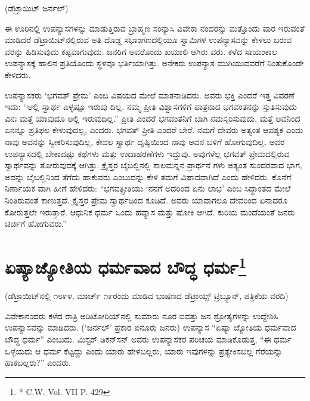 \delimiter

\begin{center}
(ಡೆಟ್ರಾಯಿಟ್​ ಜರ್ನಲ್​)
\end{center}

ಈ ಊರಿನಲ್ಲಿ ಉಪನ್ಯಾಸಗಳನ್ನು ಮಾಡುತ್ತಿರುವ ಬ್ರಾಹ್ಮಣ ಸಂನ್ಯಾಸಿ ವಿವೇಕಾ ನಂದರನ್ನು ಮತ್ತೊಂದು ವಾರ ಇರುವಂತೆ ಮಾಡಿದರೆ ಡೆಟ್ರಾಯಿಟ್​ನಲ್ಲಿರುವ ಅತಿ ದೊಡ್ಡ ಸಭಾಂಗಣದಲ್ಲಿಯೂ ಸ್ವಾಮಿಗಳ ಉಪನ್ಯಾಸವನ್ನು ಕೇಳಲು ಬರುವ ವರನ್ನು ಹಿಡಿಸುವುದು ಕಷ್ಟವಾಗುವುದು. ಜನರಿಗೆ ಅವರೊಂದು ಖಯಾಲಿ ಆಗಿರು ವರು. ಕಳೆದ ಸಾಯಂಕಾಲ ಉಪನ್ಯಾಸಕ್ಕೆ ಹಾಲಿನ ಪ್ರತಿಯೊಂದು ಸ್ಥಳವೂ ಭರ್ತಿಯಾಗಿತ್ತು. ಅನೇಕರು ಉಪನ್ಯಾಸ ಮುಗಿಯುವವರೆಗೆ ನಿಂತುಕೊಂಡೇ ಕೇಳಿದರು.

ಉಪನ್ಯಾಸಕರು ‘ಭಗವತ್​ ಪ್ರೇಮ’ ಎಂಬ ವಿಷಯದ ಮೇಲೆ ಮಾತನಾಡಿದರು. ಅವರು ಭಕ್ತಿ ಎಂದರೆ ಇತ್ತ ವಿವರಣೆ ಇದು: “ಅಲ್ಲಿ ಸ್ವಾರ್ಥ ಎಳ್ಳಷ್ಟೂ ಇರುವು ದಿಲ್ಲ. ನಮ್ಮ ಪ್ರೀತಿ ವಿಶ್ವಾಸಗಳಿಗೆ ಪಾತ್ರನಾದ ಭಗವಂತನನ್ನು ಸ್ತುತಿಸುವುದು ವಿನಃ ಮತ್ತೆ ಯಾವುದೂ ಅಲ್ಲಿ ಇರುವುದಿಲ್ಲ.” ಪ್ರೀತಿ ಎಂದರೆ ಭಗವಂತನಿಗೆ ಬಾಗಿ ನಮಸ್ಕರಿಸುವುದು, ಮತ್ತೆ ಅವನಿಂದ ಏನನ್ನೂ ಪ್ರತಿಫಲ ಕೇಳುವುದಲ್ಲ, ಎಂದರು. ಭಗವತ್​ ಪ್ರೀತಿ ಎಂದರೆ ಬೇರೆ. ನಮಗೆ ದೇವರು ಅತ್ಯಂತ ಆವಶ್ಯಕ ಎಂದು ನಾವು ಅವನನ್ನು ಸ್ವೀಕರಿಸುವುದಿಲ್ಲ, ಕೇವಲ ಸ್ವಾರ್ಥ ದೃಷ್ಟಿಯಿಂದ ನಾವು ಅವನ ಬಳಿಗೆ ಹೋಗುವುದಿಲ್ಲ. ಅವರ ಉಪನ್ಯಾಸದಲ್ಲಿ ಬೇಕಾದಷ್ಟು ಕಥೆಗಳು ಮತ್ತು ಉದಾಹರಣೆಗಳು ಇದ್ದುವು. ಅವುಗಳೆಲ್ಲ ಭಗವತ್​ ಪ್ರೇಮದಲ್ಲಿರುವ ಸ್ವಾರ್ಥವನ್ನು ತೋರುವುದಕ್ಕೆ ಆಗಿತ್ತು. ಕ್ರೈಸ್ತರ ಬೈಬಲ್ಲಿನಲ್ಲಿ ಸಾಲಮನ್ನನ ಪ್ರಾರ್ಥನೆ ಗಳು ಅತ್ಯಂತ ಸುಂದರವಾದ ಭಾಗ, ಅದನ್ನು ಬೈಬಲ್ಲಿನಿಂದ ತೆಗೆದು ಹಾಕುವರು ಎಂಬುದನ್ನು ಕೇಳಿ ತಮಗೆ ವಿಷಾದವಾಗಿದೆ ಎಂದು ಹೇಳಿದರು. ಕೊನೆಗೆ ನಿರ್ಣಾಯಕ ವಾಗಿ ಹೀಗೆ ಹೇಳಿದರು: “ಭಗವತ್ಪ್ರೀತಿಯು ‘ನನಗೆ ಅದರಿಂದ ಏನು ಲಾಭ’ ಎಂಬ ಸಿದ್ಧಾಂತದ ಮೇಲೆ ನಿಂತಿರುವಂತೆ ಕಾಣುತ್ತದೆ. ಕ್ರೈಸ್ತರ ಪ್ರೇಮ ಸ್ವಾರ್ಥದಿಂದ ಕೂಡಿದೆ. ಅವರು ಯಾವಾಗಲೂ ದೇವರಿಂದ ಏನಾದರೂ ಕೋರುತ್ತಲೇ ಇರುತ್ತಾರೆ. ಆಧುನಿಕ ಧರ್ಮ ಒಂದು ಹವ್ಯಾಸ ಮತ್ತು ಷೋಕಿ ಆಗಿದೆ. ಕುರಿಯ ಮಂದೆಯಂತೆ ಜನರು ಚರ್ಚಿಗೆ ಹೋಗುವರು.”


\section[ಏಷ್ಯಾಜ್ಯೋತಿಯ ಧರ್ಮವಾದ ಬೌದ್ಧ ಧರ್ಮ]{ಏಷ್ಯಾಜ್ಯೋತಿಯ ಧರ್ಮವಾದ ಬೌದ್ಧ ಧರ್ಮ\protect\footnote{* C.W. Vol. VII P. 429}}

\begin{center}
(ಡೆಟ್ರಾಯಿಟ್​ನಲ್ಲಿ ೧೮೯೪, ಮಾರ್ಚ್​ ೧೯ರಂದು ಮಾಡಿದ ಭಾಷಣದ ಡೆಟ್ರಾಯ್ಟ್​ ಟ್ರಿಬ್ಯೂನ್​, ಪತ್ರಿಕೆಯ ವರದಿ)
\end{center}

ವಿವೇಕಾನಂದರು ಕಳೆದ ರಾತ್ರಿ ಅಡಿಟೋರಿಯ್​ನಲ್ಲಿ ಸುಮಾರು ನೂರ ಐವತ್ತು ಜನ ಶ್ರೋತೃಗಳನ್ನು ಉದ್ದೇಶಿಸಿ ಉಪನ್ಯಾಸವನ್ನು ಮಾಡಿದರು. (‘ಜರ್ನಲ್​’ ಪ್ರಕಾರ ಐನೂರು ಜನರು) ಉಪನ್ಯಾಸ “ಏಷ್ಯಾ ಜ್ಯೋತಿಯ ಧರ್ಮವಾದ ಬೌದ್ಧ ಧರ್ಮ” ಎಂಬುದು. ಮಿಸ್ಟರ್​ ಡಿಕನ್​ಸನ್​ ಅವರು ಉಪನ್ಯಾಸಕರ ಪರಿಚಯ ಮಾಡಿಕೊಡುತ್ತ, “ಈ ಧರ್ಮ ಒಳ್ಳೆಯದು ಆ ಧರ್ಮ ಕೆಟ್ಟದ್ದು ಎಂದು ಯಾರು ಹೇಳಬಲ್ಲರು, ಯಾರು ಇವುಗಳನ್ನು ಪ್ರತ್ಯೇಕಿಸಬಲ್ಲ ಗೆರೆಯನ್ನು ಹಾಕಬಲ್ಲರು?” ಎಂದರು.

